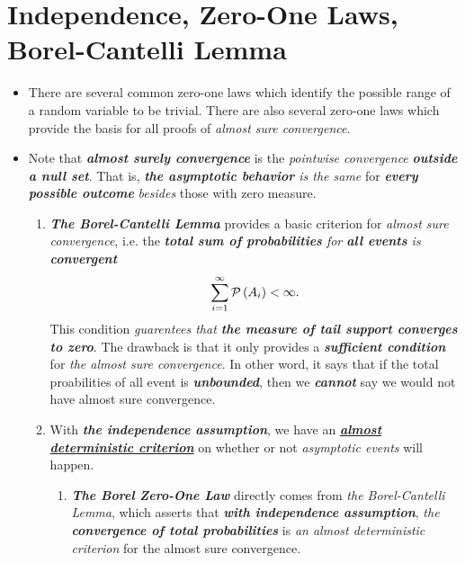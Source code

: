 \documentclass[11pt]{article}
\begin{document}
\section{Independence, Zero-One Laws, Borel-Cantelli Lemma}
\begin{itemize}
\item \begin{remark}
There are several common zero-one laws which identify the possible range of a
random variable to be trivial. There are also several zero-one laws which provide
the basis for all proofs of \emph{almost sure convergence}. 
\end{remark}

\item \begin{remark}
Note that \emph{\textbf{almost surely convergence}} is the \emph{pointwise convergence} \emph{\textbf{outside a null set}}. That is, \emph{\textbf{the asymptotic behavior} is the same} for \emph{\textbf{every possible outcome}} \emph{besides} those with zero measure.
\begin{enumerate}
\item \emph{\textbf{The Borel-Cantelli Lemma}} provides a basic criterion for \emph{almost sure convergence}, i.e. the \emph{\textbf{total sum of probabilities} for \textbf{all events} is \textbf{convergent}}
\begin{align*}
\sum_{i=1}^{\infty}{\mathcal P}\left(A_i\right) < \infty. 
\end{align*} This condition \emph{guarentees that \textbf{the measure of tail support converges to zero}}. The drawback is that it only provides a \emph{\textbf{sufficient condition}} for \emph{the almost sure convergence}. In other word, it says that if the total proabilities of all event is \emph{\textbf{unbounded}}, then we \textit{\textbf{cannot}} say we would not have almost sure convergence.

\item With \emph{\textbf{the independence assumption}}, we have an \underline{\emph{\textbf{almost deterministic criterion}}} on whether or not \emph{asymptotic events} will happen.
\begin{enumerate}
\item \emph{\textbf{The Borel Zero-One Law}} directly comes from \emph{the Borel-Cantelli Lemma}, which asserts that \emph{\textbf{with independence assumption}}, \emph{the \textbf{convergence of total probabilities}} is \emph{an almost deterministic criterion} for the almost sure convergence.


\end{enumerate}
\end{enumerate}
\end{remark}
\end{itemize}
\end{document}
